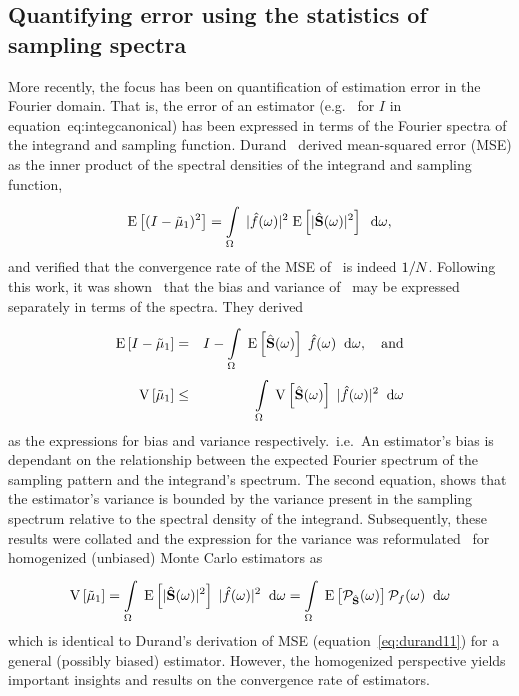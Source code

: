 \subsection{Quantifying error using the statistics of sampling spectra}
More recently, the focus has been on quantification of estimation error in the Fourier domain. That is, the error of an estimator (e.g.~ for $I$ in equation~{eq:integcanonical}) has been expressed in terms of the Fourier spectra of the integrand and sampling function. 
Durand~\cite{durand2011frequency} derived mean-squared error (MSE) as the inner product of the spectral densities of the integrand and sampling function, 
\begin{equation} \label{eq:durand11}
   \mathrm{E} \left[(I-\tilde\mu_\mathrm{1})^2 \right] = \displaystyle\int\limits_{\Omega}^{} \; |\hat{f}(\omega)|^2 \; \mathrm{E} \left[|\hat{\mathbf{S}}(\omega)|^2 \right] \;\; \mathrm{d}\omega,
\end{equation}
and verified that the convergence rate of the MSE of \estim{\N}\ is indeed $1/N$. Following this work, it was shown~\cite{Subr:2013:FAS} that the bias and variance of \ may be expressed separately in terms of the spectra. They derived
\begin{eqnarray}
  \mathrm{E} \left[I-\tilde\mu_\mathrm{1} \right] &=& I - \displaystyle\int\limits_{\Omega}^{} \; \mathrm{E} \left[\hat{\mathbf{S}}(\omega) \right] \; \hat{f}(\omega)  \;\; \mathrm{d}\omega, \quad \mathrm{and} \\
    \mathrm{V} \left[\tilde\mu_\mathrm{1}\right] &\leq& \displaystyle\int\limits_{\Omega}^{} \; \mathrm{V} \left[\hat{\mathbf{S}}(\omega)\right] \; |\hat{f}(\omega)|^2 \;\; \mathrm{d}\omega
\end{eqnarray}
as the expressions for bias and variance respectively.~i.e.~An estimator's bias is dependant on the relationship between the expected Fourier spectrum of the sampling pattern and the integrand's spectrum. The second equation, shows that the estimator's variance is bounded by the variance present in the sampling spectrum relative to the spectral density of the integrand. Subsequently, these results were collated and the expression for the variance was reformulated~\cite{Pilleboue:2015:VAM} for homogenized (unbiased) Monte Carlo estimators as
%
\begin{equation} \label{eq:pillebouevar}
\mathrm{V} \left[\tilde\mu_\mathrm{1}\right] 
= \displaystyle\int\limits_{\Omega}^{} \; \mathrm{E} \left[|\hat{\mathbf{S}}(\omega)|^2 \right]\;|\hat{f}(\omega)|^2 \;\; \mathrm{d}\omega 
= \displaystyle\int\limits_{\Omega}^{} \; \mathrm{E} \left[\mathcal{P}_{\hat{\mathbf{S}}}(\omega) \right] \mathcal{P}_{f}(\omega) \;\; \mathrm{d}\omega 
\end{equation}
which is identical to Durand's derivation of MSE (equation~\ref{eq:durand11}) for a general (possibly biased) estimator. However, the homogenized perspective yields important insights and results on the convergence rate of estimators.
%

